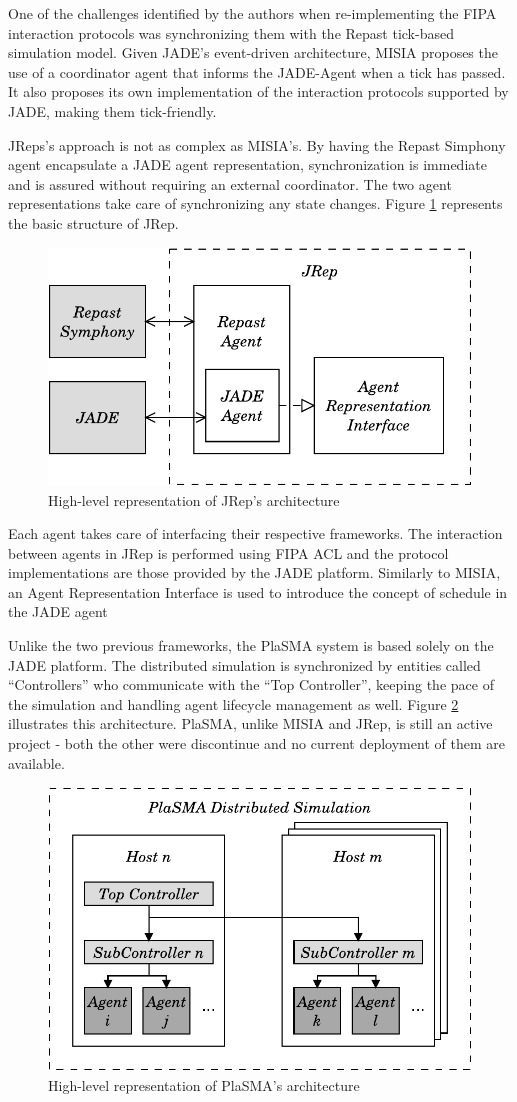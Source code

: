 One of the challenges identified by the authors when re-implementing the FIPA interaction protocols was synchronizing them with the Repast tick-based simulation model. Given JADE's event-driven architecture, MISIA proposes the use of a coordinator agent that informs the JADE-Agent when a tick has passed. It also proposes its own implementation of the interaction protocols supported by JADE, making them tick-friendly.

JReps's approach is not as complex as MISIA's.
By having the Repast Simphony agent encapsulate a JADE agent representation, synchronization is immediate and is assured without requiring an external coordinator.
The two agent representations take care of synchronizing any state changes.
Figure \ref{fig:jrep} represents the basic structure of JRep.

\begin{figure}[h]
	\centering
	\includegraphics[width=0.5\linewidth]{figures/jrep.pdf}
	\caption[JRep's architecture]{High-level representation of JRep's architecture}
	\label{fig:jrep}
\end{figure}

Each agent takes care of interfacing their respective frameworks. The interaction between agents in JRep is performed using FIPA ACL and the protocol implementations are those provided by the JADE platform. Similarly to MISIA, an Agent Representation Interface is used to introduce the concept of schedule in the JADE agent

Unlike the two previous frameworks, the PlaSMA system is based solely on the JADE platform. The distributed simulation is synchronized by entities called ``Controllers'' who communicate with the ``Top Controller'', keeping the pace of the simulation and handling agent lifecycle management as well. Figure \ref{fig:plasma} illustrates this architecture. PlaSMA, unlike MISIA and JRep, is still an active project - both the other were discontinue and no current deployment of them are available.

\begin{figure}[h]
	\centering
	\includegraphics[width=0.5\linewidth]{figures/PlaSMA.pdf}
	\caption[PlaSMA's architecture]{High-level representation of PlaSMA's architecture}
	\label{fig:plasma}
\end{figure}

